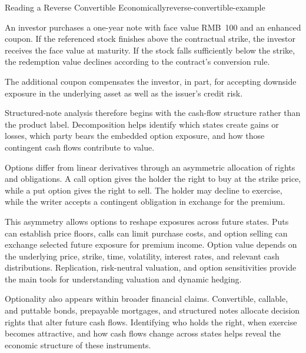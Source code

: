 \begin{example}{Reading a Reverse Convertible Economically}{reverse-convertible-example}

An investor purchases a one-year note with face value RMB~100 and an enhanced coupon. If the referenced stock finishes above the contractual strike, the investor receives the face value at maturity. If the stock falls sufficiently below the strike, the redemption value declines according to the contract's conversion rule.

The additional coupon compensates the investor, in part, for accepting downside exposure in the underlying asset as well as the issuer's credit risk.

\end{example}

Structured-note analysis therefore begins with the cash-flow structure rather than the product label. Decomposition helps identify which states create gains or losses, which party bears the embedded option exposure, and how those contingent cash flows contribute to value.






Options differ from linear derivatives through an asymmetric allocation of rights and obligations. A call option gives the holder the right to buy at the strike price, while a put option gives the right to sell. The holder may decline to exercise, while the writer accepts a contingent obligation in exchange for the premium.

This asymmetry allows options to reshape exposures across future states. Puts can establish price floors, calls can limit purchase costs, and option selling can exchange selected future exposure for premium income. Option value depends on the underlying price, strike, time, volatility, interest rates, and relevant cash distributions. Replication, risk-neutral valuation, and option sensitivities provide the main tools for understanding valuation and dynamic hedging.

Optionality also appears within broader financial claims. Convertible, callable, and puttable bonds, prepayable mortgages, and structured notes allocate decision rights that alter future cash flows. Identifying who holds the right, when exercise becomes attractive, and how cash flows change across states helps reveal the economic structure of these instruments.



